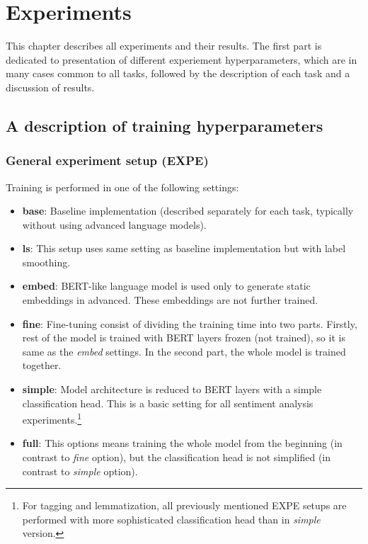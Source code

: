 \chapter{Experiments}
\label{chap:exp}
This chapter describes all experiments and their results. The first part is dedicated to presentation of different experiement hyperparameters, which are in many cases common to all tasks, followed by the description of each task and a discussion of results.
\section{A description of training hyperparameters}
\label{sec:expe}
\subsection{General experiment setup (EXPE)}
Training is performed in one of the following settings:
\begin{itemize}
\item \textbf{base}: Baseline implementation (described separately for each task, typically without using advanced language models).
\item \textbf{ls}: This setup uses same setting as baseline implementation but with label smoothing.
\item \textbf{embed}: BERT-like language model is used only to generate static embeddings in advanced. These embeddings are not further trained.
\item \textbf{fine}: Fine-tuning consist of dividing the training time into two parts. Firstly, rest of the model is trained with BERT layers frozen (not trained), so it is same as the \textit{embed} settings. In the second part, the whole model is trained together.
\item \textbf{simple}: Model architecture is reduced to BERT layers with a simple classification head. This is a basic setting for all sentiment analysis experiments.\footnote{For tagging and lemmatization, all previously mentioned EXPE setups are performed with more sophisticated classification head than in \textit{simple} version.} 
\item \textbf{full}: This options means training the whole model from the beginning (in contrast to \textit{fine} option), but the classification head is not simplified (in contrast to \textit{simple} option).
\end{itemize}
